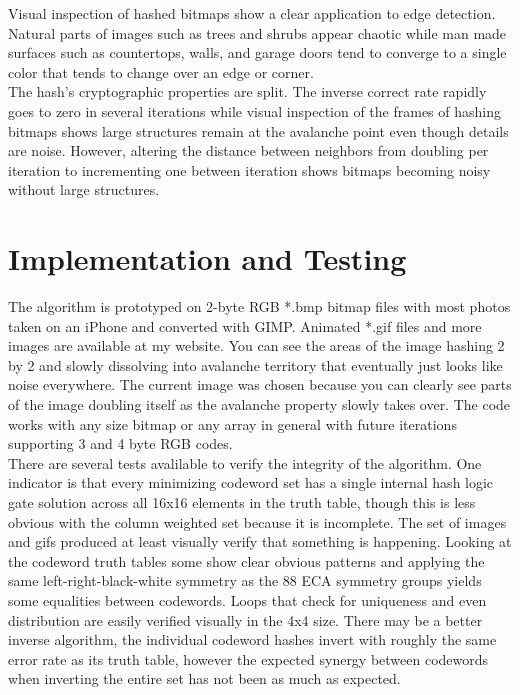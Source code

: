 \documentclass[11pt]{article}
\begin{document}
Visual inspection of hashed bitmaps show a clear application to edge detection. Natural parts of images such as trees and shrubs appear chaotic while man made surfaces such as countertops, walls, and garage doors tend to converge to a single color that tends to change over an edge or corner.\\

The hash's cryptographic properties are split. The inverse correct rate rapidly goes to zero in several iterations while visual inspection of the frames of hashing bitmaps shows large structures remain at the avalanche point even though details are noise. However, altering the distance between neighbors from doubling per iteration to incrementing one between iteration shows bitmaps becoming noisy without large structures.\\

\section{Implementation and Testing}

The algorithm is prototyped on 2-byte RGB *.bmp bitmap files with most photos taken on an iPhone and converted with GIMP. Animated *.gif files and more images are available at my website. You can see the areas of the image hashing 2 by 2 and slowly dissolving into avalanche territory that eventually just looks like noise everywhere. The current image was chosen because you can clearly see parts of the image doubling itself as the avalanche property slowly takes over. The code works with any size bitmap or any array in general with future iterations supporting 3 and 4 byte RGB codes. \\

There are several tests avalilable to verify the integrity of the algorithm. One indicator is that every minimizing codeword set has a single internal hash logic gate solution across all 16x16 elements in the truth table, though this is less obvious with the column weighted set because it is incomplete. The set of images and gifs produced at least visually verify that something is happening. Looking at the codeword truth tables some show clear obvious patterns and applying the same left-right-black-white symmetry as the 88 ECA symmetry groups \cite{Wolfram} yields some equalities between codewords. Loops that check for uniqueness and even distribution are easily verified visually in the 4x4 size. There may be a better inverse algorithm, the individual codeword hashes invert with roughly the same error rate as its truth table, however the expected synergy between codewords when inverting the entire set has not been as much as expected.\\
\end{document}
